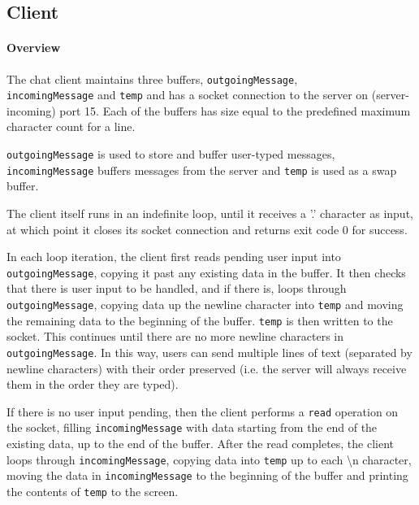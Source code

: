 \documentclass[]{article}
\begin{document}
\subsection{Client}
\paragraph{Overview} The chat client maintains three buffers, \texttt{outgoingMessage}, \\ \texttt{incomingMessage} and \texttt{temp} and has a socket connection to the server on (server-incoming) port 15. Each of the buffers has size equal to the predefined maximum character count for a line.

\texttt{outgoingMessage} is used to store and buffer user-typed messages, \\ \texttt{incomingMessage} buffers messages from the server and \texttt{temp} is used as a swap buffer.

The client itself runs in an indefinite loop, until it receives a '.' character as input, at which point it closes its socket connection and returns exit code 0 for success. 

In each loop iteration, the client first reads pending user input into \\ \texttt{outgoingMessage}, copying it past any existing data in the buffer. It then checks that there is user input to be handled, and if there is, loops through \texttt{outgoingMessage}, copying data up the newline character into \texttt{temp} and moving the remaining data to the beginning of the buffer. \texttt{temp} is then written to the socket. This continues until there are no more newline characters in \texttt{outgoingMessage}. In this way, users can send multiple lines of text (separated by newline characters) with their order preserved (i.e. the server will always receive them in the order they are typed).

If there is no user input pending, then the client performs a \texttt{read} operation on the socket, filling \texttt{incomingMessage} with data starting from the end of the existing data, up to the end of the buffer. After the read completes, the client loops through \texttt{incomingMessage}, copying data into \texttt{temp} up to each \textbackslash n character, moving the data in \texttt{incomingMessage} to the beginning of the buffer and printing the contents of \texttt{temp} to the screen. \\

\pagebreak
\end{document}
